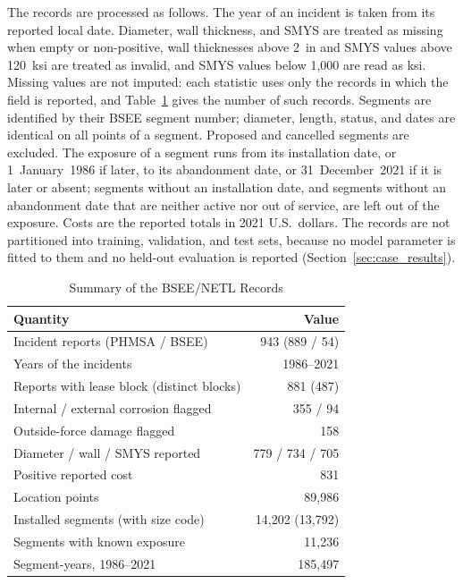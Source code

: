 \documentclass[journal]{IEEEtran}
\begin{document}
The records are processed as follows. The year of an incident is taken
from its reported local date. Diameter, wall thickness, and SMYS are
treated as missing when empty or non-positive, wall thicknesses above
2~in and SMYS values above 120~ksi are treated as invalid, and SMYS
values below 1{,}000 are read as ksi. Missing values are not imputed:
each statistic uses only the records in which the field is reported,
and Table~\ref{tab:bsee} gives the number of such records. Segments are
identified by their BSEE segment number; diameter, length, status, and
dates are identical on all points of a segment. Proposed and cancelled
segments are excluded. The exposure of a segment runs from its
installation date, or 1~January~1986 if later, to its abandonment date,
or 31~December~2021 if it is later or absent; segments without an
installation date, and segments without an abandonment date that are
neither active nor out of service, are left out of the exposure. Costs
are the reported totals in 2021 U.S.\ dollars. The records are not
partitioned into training, validation, and test sets, because no model
parameter is fitted to them and no held-out evaluation is reported
(Section~\ref{sec:case_results}).



\begin{table}[t]
\centering
\caption{Summary of the BSEE/NETL Records}
\label{tab:bsee}
\footnotesize
\begin{tabular}{lr}
\toprule
Quantity & Value \\
\midrule
Incident reports (PHMSA / BSEE) & 943 (889 / 54) \\
Years of the incidents & 1986--2021 \\
Reports with lease block (distinct blocks) & 881 (487) \\
Internal / external corrosion flagged & 355 / 94 \\
Outside-force damage flagged & 158 \\
Diameter / wall / SMYS reported & 779 / 734 / 705 \\
Positive reported cost & 831 \\
Location points & 89{,}986 \\
Installed segments (with size code) & 14{,}202 (13{,}792) \\
Segments with known exposure & 11{,}236 \\
Segment-years, 1986--2021 & 185{,}497 \\
\bottomrule
\end{tabular}
\end{table}
\end{document}
